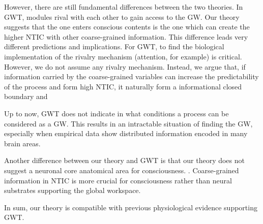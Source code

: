 \documentclass[utf8]{article}
\begin{document}
		However, there are still fundamental differences between the two theories. 
		In GWT, modules rival with each other to gain access to the GW. Our theory suggests that the one enters conscious contents is the one which can create the higher NTIC with other coarse-grained information. This difference leads very different predictions and implications. For GWT, to find the biological implementation of the rivalry mechanism (attention, for example) is critical. However, we do not assume any rivalry mechanism. Instead, we argue that, if  information carried by the coarse-grained variables can increase the predictability of the process and form high NTIC,  it naturally form a informational closed boundary and 
		
		Up to now, GWT does not indicate in what conditions a process can be considered as a GW. This results in an intractable situation of finding the GW, especially when empirical data show distributed information encoded in many brain areas\citep{siegel2015cortical}. 
		
		Another difference between our theory and GWT is that our theory does not suggest a neuronal core anatomical area for consciousness. . Coarse-grained information in NTIC is more crucial for consciousness rather than neural substrates supporting the global workspace.
		
		In sum, our theory is compatible with previous physiological evidence supporting GWT.  
\end{document}
